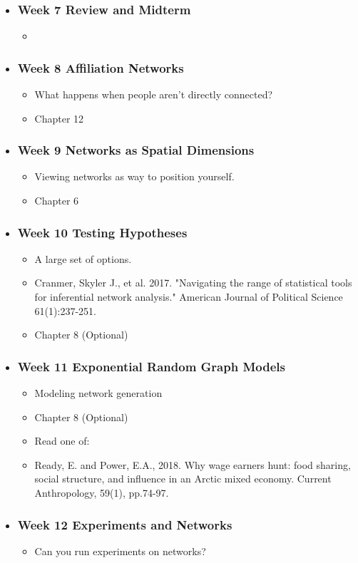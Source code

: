 \documentclass[11pt]{article}
\newenvironment{courseday}[2]{
\begin{itemize}
	\item[] \subsubsection*{\textbf{#1} #2}
	\begin{itemize}
}{
\end{itemize}
\end{itemize}
}
\begin{document}


\begin{courseday}{Week 7}{Review and Midterm}
	\item[] 
\end{courseday}



\begin{courseday}{Week 8}{Affiliation Networks}
	\item[] What happens when people aren't directly connected?
	\item[] Chapter 12
\end{courseday}



\begin{courseday}{Week 9}{Networks as Spatial Dimensions}
	\item[] Viewing networks as way to position yourself.
	\item[] Chapter 6 
\end{courseday}


\begin{courseday}{Week 10}{Testing Hypotheses}
	\item[] A large set of options. 
	\item[] Cranmer, Skyler J., et al. 2017. "Navigating the range of statistical tools for inferential network analysis." American Journal of Political Science 61(1):237-251.
	\item[] Chapter 8 (Optional)
\end{courseday}


\begin{courseday}{Week 11}{Exponential Random Graph Models}
	\item[] Modeling network generation
	\item[] Chapter 8 (Optional)
	\item[] Read one of:
	\item Ready, E. and Power, E.A., 2018. Why wage earners hunt: food sharing, social structure, and influence in an Arctic mixed economy. Current Anthropology, 59(1), pp.74-97.
\end{courseday}

\begin{courseday}{Week  12}{Experiments and Networks}
	\item[] Can you run experiments on networks?
\end{courseday}
\end{document}

